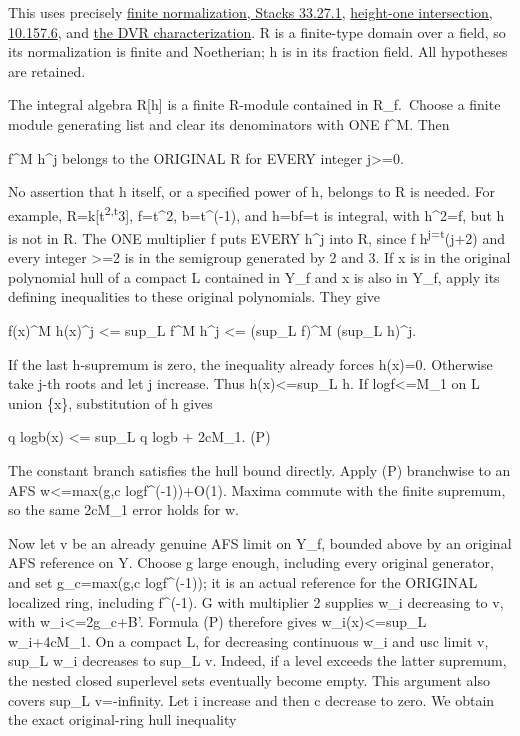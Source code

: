 \documentclass[
  10pt,
]{article}
\begin{document}
This uses precisely
\href{https://stacks.math.columbia.edu/tag/0BXQ}{finite normalization,
Stacks 33.27.1},
\href{https://stacks.math.columbia.edu/tag/031T}{height-one
intersection, 10.157.6}, and
\href{https://stacks.math.columbia.edu/tag/00PD}{the DVR
characterization}. R is a finite-type domain over a field, so its
normalization is finite and Noetherian; h is in its fraction field. All
hypotheses are retained.

The integral algebra R{[}h{]} is a finite R-module contained in
R\_f.~Choose a finite module generating list and clear its denominators
with ONE f\^{}M. Then

f\^{}M h\^{}j belongs to the ORIGINAL R for EVERY integer
j\textgreater=0.

No assertion that h itself, or a specified power of h, belongs to R is
needed. For example, R=k{[}t\textsuperscript{2,t}3{]}, f=t\^{}2,
b=t\^{}(-1), and h=bf=t is integral, with h\^{}2=f, but h is not in R.
The ONE multiplier f puts EVERY h\^{}j into R, since f
h\textsuperscript{j=t}(j+2) and every integer \textgreater=2 is in the
semigroup generated by 2 and 3. If x is in the original polynomial hull
of a compact L contained in Y\_f and x is also in Y\_f, apply its
defining inequalities to these original polynomials. They give

\textbar f(x)\textbar\^{}M \textbar h(x)\textbar\^{}j \textless= sup\_L
\textbar f\textbar\^{}M \textbar h\textbar\^{}j \textless= (sup\_L
\textbar f\textbar)\^{}M (sup\_L \textbar h\textbar)\^{}j.

If the last h-supremum is zero, the inequality already forces h(x)=0.
Otherwise take j-th roots and let j increase. Thus
\textbar h(x)\textbar\textless=sup\_L \textbar h\textbar. If
\textbar log\textbar f\textbar\textbar\textless=M\_1 on L union \{x\},
substitution of h gives

q log\textbar b(x)\textbar{} \textless= sup\_L q log\textbar b\textbar{}
+ 2cM\_1. (P)

The constant branch satisfies the hull bound directly. Apply (P)
branchwise to an AFS w\textless=max(g,c
log\textbar f\^{}(-1)\textbar)+O(1). Maxima commute with the finite
supremum, so the same 2cM\_1 error holds for w.

Now let v be an already genuine AFS limit on Y\_f, bounded above by an
original AFS reference on Y. Choose g large enough, including every
original generator, and set g\_c=max(g,c log\textbar f\^{}(-1)\textbar);
it is an actual reference for the ORIGINAL localized ring, including
f\^{}(-1). G with multiplier 2 supplies w\_i decreasing to v, with
w\_i\textless=2g\_c+B'. Formula (P) therefore gives
w\_i(x)\textless=sup\_L w\_i+4cM\_1. On a compact L, for decreasing
continuous w\_i and usc limit v, sup\_L w\_i decreases to sup\_L v.
Indeed, if a level exceeds the latter supremum, the nested closed
superlevel sets eventually become empty. This argument also covers
sup\_L v=-infinity. Let i increase and then c decrease to zero. We
obtain the exact original-ring hull inequality
\end{document}

